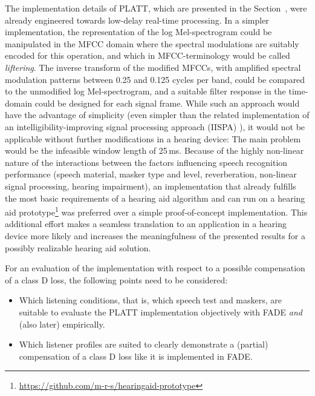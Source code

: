 \documentclass[10pt,a4paper,twocolumn]{article}
\begin{document}
The implementation details of PLATT, which are presented in the Section~, were already engineered towards low-delay real-time processing.
%
In a simpler implementation, the representation of the log Mel-spectrogram could be manipulated in the MFCC domain where the spectral modulations are suitably encoded for this operation, and which in MFCC-terminology would be called \emph{liftering}.
%
The inverse transform of the modified MFCCs, with amplified spectral modulation patterns between 0.25 and 0.125 cycles per band, could be compared to the unmodified log Mel-spectrogram, and a suitable filter response in the time-domain could be designed for each signal frame.
%
While such an approach would have the advantage of simplicity (even simpler than the related implementation of an intelligibility-improving signal processing approach (IISPA) \cite{schaedler2020b}), it would not be applicable without further modifications in a hearing device: The main problem would be the infeasible window length of 25\,ms.
%
Because of the highly non-linear nature of the interactions between the factors influencing speech recognition performance (speech material, masker type and level, reverberation, non-linear signal processing, hearing impairment), an implementation that already fulfills the most basic requirements of a hearing aid algorithm and can run on a hearing aid prototype\footnote{\url{https://github.com/m-r-s/hearingaid-prototype}} was preferred over a simple proof-of-concept implementation.
%
This additional effort makes a seamless translation to an application in a hearing device more likely and increases the meaningfulness of the presented results for a possibly realizable hearing aid solution.

For an evaluation of the implementation with respect to a possible compensation of a class D loss, the following points need to be considered:
\begin{itemize}
  \item[1)] Which listening conditions, that is, which speech test and maskers, are suitable to evaluate the PLATT implementation objectively with FADE \emph{and} (also later) empirically.
  \item[2)] Which listener profiles are suited to clearly demonstrate a (partial) compensation of a class D loss like it is implemented in FADE.
\end{itemize}
\end{document}
